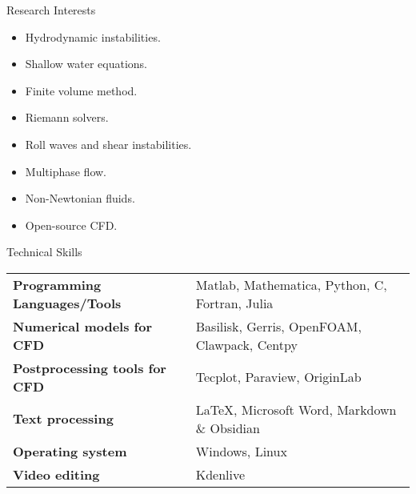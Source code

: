 \documentclass{resume} %
\makeatletter
\newcommand{\entry}[2]{#1 & #2 \tabularnewline} %
\newcommand{\tableEnv}[2]{%
  \begin{rSection}{#1} %
    \begin{adjustwidth}{0.0in}{0.1in} %
      \begin{tabularx}{\linewidth}{@{} >{\bfseries}l @{\hspace{6ex}} X @{}}
        #2 %
      \end{tabularx}
    \end{adjustwidth}
  \end{rSection}
}
\makeatother
\begin{document}
\begin{rSection}{Research Interests}
	\begin{itemize}
		\item Hydrodynamic instabilities.
		\item Shallow water equations.
		\item Finite volume method.
		\item Riemann solvers.
		\item Roll waves and shear instabilities.
		\item Multiphase flow.
		\item Non-Newtonian fluids.
		\item Open-source CFD.
	\end{itemize}
	
\end{rSection}


\tableEnv{Technical Skills}{
	\entry{Programming Languages/Tools}{Matlab, Mathematica, Python, C, Fortran, Julia}
    \entry{Numerical models for CFD}{Basilisk, Gerris, OpenFOAM, Clawpack, Centpy}
    \entry{Postprocessing tools for CFD}{Tecplot, Paraview, OriginLab}
    \entry{Text processing}{\LaTeX, Microsoft Word, Markdown \& Obsidian}
    \entry{Operating system}{Windows, Linux}
    \entry{Video editing}{Kdenlive}
}


\end{document}
